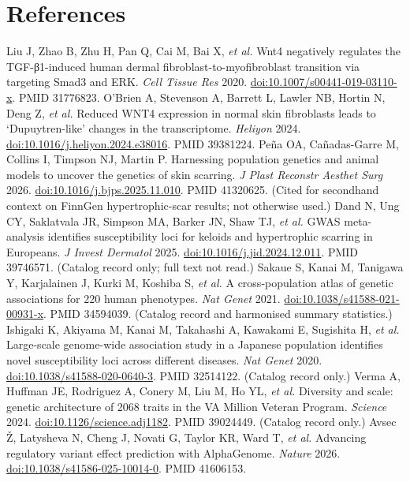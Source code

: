 \documentclass[10pt,twocolumn,a4paper]{article}
\makeatletter
\renewenvironment{thebibliography}[1]{\section*{References}\small\list{\@biblabel{\@arabic\c@enumiv}}{\settowidth\labelwidth{[99]}\leftmargin\labelwidth\advance\leftmargin\labelsep\setlength{\itemsep}{1.5pt}\setlength{\parsep}{0pt}\usecounter{enumiv}\renewcommand\theenumiv{\@arabic\c@enumiv}}\raggedright}{\endlist}
\makeatother
\begin{document}
\begin{thebibliography}{99}
 Liu J, Zhao B, Zhu H, Pan Q, Cai M, Bai X, \emph{et al.} Wnt4 negatively regulates the TGF-β1-induced human dermal fibroblast-to-myofibroblast transition via targeting Smad3 and ERK. \emph{Cell Tissue Res} 2020. \href{https://doi.org/10.1007/s00441-019-03110-x}{doi:10.1007/s00441-019-03110-x}. PMID 31776823.
 O'Brien A, Stevenson A, Barrett L, Lawler NB, Hortin N, Deng Z, \emph{et al.} Reduced WNT4 expression in normal skin fibroblasts leads to `Dupuytren-like' changes in the transcriptome. \emph{Heliyon} 2024. \href{https://doi.org/10.1016/j.heliyon.2024.e38016}{doi:10.1016/j.heliyon.2024.e38016}. PMID 39381224.
 Peña OA, Cañadas-Garre M, Collins I, Timpson NJ, Martin P. Harnessing population genetics and animal models to uncover the genetics of skin scarring. \emph{J Plast Reconstr Aesthet Surg} 2026. \href{https://doi.org/10.1016/j.bjps.2025.11.010}{doi:10.1016/j.bjps.2025.11.010}. PMID 41320625. (Cited for secondhand context on FinnGen hypertrophic-scar results; not otherwise used.)
 Dand N, Ung CY, Saklatvala JR, Simpson MA, Barker JN, Shaw TJ, \emph{et al.} GWAS meta-analysis identifies susceptibility loci for keloids and hypertrophic scarring in Europeans. \emph{J Invest Dermatol} 2025. \href{https://doi.org/10.1016/j.jid.2024.12.011}{doi:10.1016/j.jid.2024.12.011}. PMID 39746571. (Catalog record only; full text not read.)
 Sakaue S, Kanai M, Tanigawa Y, Karjalainen J, Kurki M, Koshiba S, \emph{et al.} A cross-population atlas of genetic associations for 220 human phenotypes. \emph{Nat Genet} 2021. \href{https://doi.org/10.1038/s41588-021-00931-x}{doi:10.1038/s41588-021-00931-x}. PMID 34594039. (Catalog record and harmonised summary statistics.)
 Ishigaki K, Akiyama M, Kanai M, Takahashi A, Kawakami E, Sugishita H, \emph{et al.} Large-scale genome-wide association study in a Japanese population identifies novel susceptibility loci across different diseases. \emph{Nat Genet} 2020. \href{https://doi.org/10.1038/s41588-020-0640-3}{doi:10.1038/s41588-020-0640-3}. PMID 32514122. (Catalog record only.)
 Verma A, Huffman JE, Rodriguez A, Conery M, Liu M, Ho YL, \emph{et al.} Diversity and scale: genetic architecture of 2068 traits in the VA Million Veteran Program. \emph{Science} 2024. \href{https://doi.org/10.1126/science.adj1182}{doi:10.1126/science.adj1182}. PMID 39024449. (Catalog record only.)
 Avsec Ž, Latysheva N, Cheng J, Novati G, Taylor KR, Ward T, \emph{et al.} Advancing regulatory variant effect prediction with AlphaGenome. \emph{Nature} 2026. \href{https://doi.org/10.1038/s41586-025-10014-0}{doi:10.1038/s41586-025-10014-0}. PMID 41606153.

\end{thebibliography}
\end{document}
